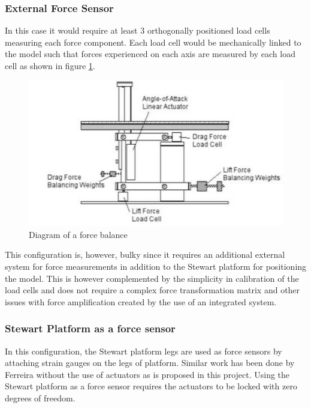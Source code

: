 \subsubsection*{External Force Sensor}
In this case it would require at least 3 orthogonally positioned load cells measuring each force component. Each load cell would be mechanically linked to the model such that forces experienced on each axis are measured by each load cell as shown in figure \ref{fig:balex}.
\begin{center}
	\begin{figure}[H]
		\centering
		\includegraphics{Figures/modBal}
		\caption[Diagram of a force balance]{Diagram of a force balance \cite{post_force_2010}}
		\label{fig:balex}
	\end{figure}
\end{center}
This configuration is, however, bulky since it requires an additional external system for force measurements in addition to the Stewart platform for positioning the model. This is however complemented by the simplicity in calibration of the load cells and does not require a complex force transformation matrix and other issues with force amplification created by the use of an integrated system.
\subsubsection*{Stewart Platform as a force sensor}
In this configuration, the Stewart platform legs are used as force sensors by attaching strain gauges on the 
legs of platform. Similar work has been done by Ferreira\cite{ferreira2015design} without the use of actuators as is proposed in this project. Using the Stewart platform as a force sensor requires the actuators to be locked with zero degrees of freedom.

